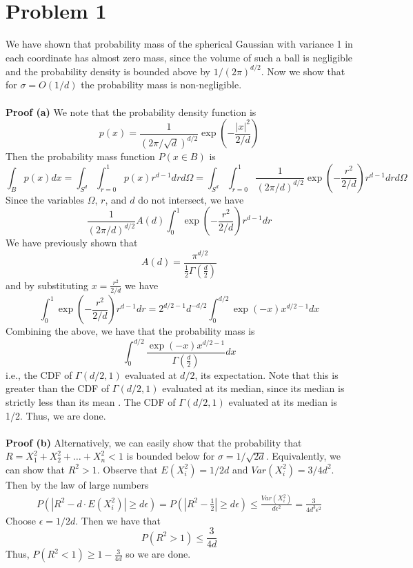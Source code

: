 \documentclass[a4paper,13pt]{article}
\begin{document}
\section*{Problem 1}

We have shown that probability mass of the spherical Gaussian with variance 1 in each coordinate has almost zero mass, since the volume of such a ball is negligible and the probability density is bounded above by $1/(2\pi)^{d/2}$. Now we show that for $\sigma = O(1/d)$ the probability mass is non-negligible.
\\\\
\textbf{Proof (a)} We note that the probability density function is 
$$p(x) = \frac{1}{(2\pi / \sqrt{d})^{d/2}} \exp \left(-\frac{\left| x \right|^2}{2/d} \right)$$
Then the probability mass function $P(x \in B)$ is
$$\int_B p(x) dx = \int_{S^d} \int_{r=0}^1 p(x) r^{d-1} dr d\Omega = \int_{S^d} \int_{r=0}^1 \frac{1}{(2\pi / d)^{d/2}} \exp \left(-\frac{r^2}{2/d} \right) r^{d-1} dr d\Omega $$
Since the variables $\Omega$, $r$, and $d$ do not intersect, we have
$$\frac{1}{(2\pi /d)^{d/2}} A(d) \int_0^1 \exp \left(-\frac{r^2}{2/d} \right) r^{d-1} dr $$
We have previously shown that
$$A(d) = \frac{\pi^{d/2}}{\frac{1}{2} \Gamma \left( \frac{d}{2} \right)}$$
and by substituting $x = \frac{r^2}{2/d}$ we have
$$\int_0^1 \exp \left(-\frac{r^2}{2/d} \right) r^{d-1} dr = 2^{d/2 - 1} d^{-d/2} \int_0^{d/2} \exp(-x) x^{d/2-1}dx $$
Combining the above, we have that the probability mass is
$$\int_0^{d/2} \frac{\exp(-x) x^{d/2-1}}{\Gamma (\frac{d}{2})} dx$$
i.e., the CDF of $\Gamma(d/2,1)$ evaluated at $d/2$, its expectation. Note that this is greater than the CDF of $\Gamma(d/2,1)$ evaluated at its median, since its median is strictly less than its mean \cite{chen1986bounds}. The CDF of $\Gamma(d/2,1)$ evaluated at its median is 1/2. Thus, we are done.
\\\\
\textbf{Proof (b)} Alternatively, we can easily show that the probability that $R = X_1^2 + X_2^2 + \dots + X_n^2 < 1$ is bounded below for $\sigma = 1/\sqrt{2d}$. Equivalently, we can show that $R^2 > 1$. Observe that $E(X_i^2) = 1/2d$ and $Var(X_i^2) = 3/4d^2$.  Then by the law of large numbers
\begin{align*}
    P\left( \left| R^2 - d \cdot E(X_i^2) \right| \geq d \epsilon \right)
    = P \left( \left| R^2 - \frac{1}{2} \right| \geq d \epsilon \right)
    \leq \frac{Var(X_i^2)}{d \epsilon^2} = \frac{3}{4d^3 \epsilon^2}
\end{align*}
Choose $\epsilon = 1/2d$. Then we have that
$$P(R^2 > 1) \leq \frac{3}{4d}$$
Thus, $P(R^2 < 1) \geq 1 - \frac{3}{4d}$ so we are done.
\end{document}
